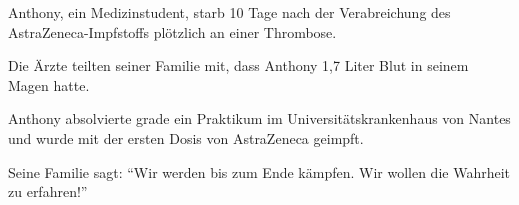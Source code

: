 Anthony, ein Medizinstudent, starb 10 Tage nach der Verabreichung des
AstraZeneca-Impfstoffs plötzlich an einer Thrombose.

Die Ärzte teilten seiner Familie mit, dass Anthony 1,7 Liter Blut in seinem
Magen hatte.

Anthony absolvierte grade ein Praktikum im Universitätskrankenhaus von Nantes
und wurde mit der ersten Dosis von AstraZeneca geimpft.

Seine Familie sagt: ``Wir werden bis zum Ende kämpfen. Wir wollen die Wahrheit
zu erfahren!''
